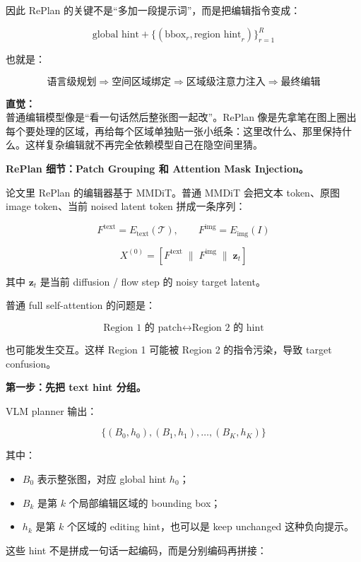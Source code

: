 因此 RePlan 的关键不是“多加一段提示词”，而是把编辑指令变成：

\[
\text{global hint}
+
\{(\text{bbox}_r,\text{region hint}_r)\}_{r=1}^{R}
\]

也就是：

\[
\text{语言级规划}
\Rightarrow
\text{空间区域绑定}
\Rightarrow
\text{区域级注意力注入}
\Rightarrow
\text{最终编辑}
\]

\begin{intubox}
\textbf{直觉：}\\
普通编辑模型像是“看一句话然后整张图一起改”。RePlan 像是先拿笔在图上圈出每个要处理的区域，再给每个区域单独贴一张小纸条：这里改什么、那里保持什么。这样复杂编辑就不再完全依赖模型自己在隐空间里猜。
\end{intubox}

\textbf{RePlan 细节：Patch Grouping 和 Attention Mask Injection。}

论文里 RePlan 的编辑器基于 MMDiT。普通 MMDiT 会把文本 token、原图 image token、当前 noised latent token 拼成一条序列：

\[
F^\text{text}
=
E_\text{text}(\mathcal{T}),
\qquad
F^\text{img}
=
E_\text{img}(I)
\]

\[
X^{(0)}
=
\left[
F^\text{text}
\;\|\;
F^\text{img}
\;\|\;
\mathbf{z}_t
\right]
\]

其中 $\mathbf{z}_t$ 是当前 diffusion / flow step 的 noisy target latent。

普通 full self-attention 的问题是：

\[
\text{Region 1 的 patch}
\longleftrightarrow
\text{Region 2 的 hint}
\]

也可能发生交互。这样 Region 1 可能被 Region 2 的指令污染，导致 target confusion。

\textbf{第一步：先把 text hint 分组。}

VLM planner 输出：

\[
\{(B_0,h_0),(B_1,h_1),\ldots,(B_K,h_K)\}
\]

其中：

\begin{itemize}[leftmargin=1.5em]
  \item $B_0$ 表示整张图，对应 global hint $h_0$；
  \item $B_k$ 是第 $k$ 个局部编辑区域的 bounding box；
  \item $h_k$ 是第 $k$ 个区域的 editing hint，也可以是 keep unchanged 这种负向提示。
\end{itemize}

这些 hint 不是拼成一句话一起编码，而是分别编码再拼接：

